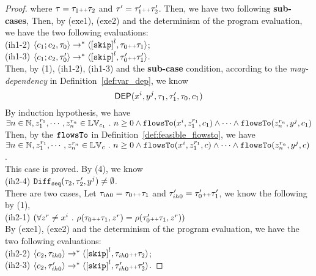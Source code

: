 \begin{proof}
  where $\mathtt{\tau} = \mathtt{\tau}_1 {\scriptscriptstyle ++} \mathtt{\tau}_2$ 
  and $\mathtt{\tau}' = \mathtt{\tau}_1' {\scriptscriptstyle ++} \mathtt{\tau}_2'$.
Then, we have two following \textbf{sub-cases},
Then, by (exe1), (exe2) and the determinism of the program evaluation, we have the two following evaluations:
\\
(ih1-2) $\config{c_1;c_2 , \trace_0} 
\rightarrow^{*} \config{\clabel{\eskip}^l, \trace_0  \tracecat \trace_1}$;
\\
(ih1-3) $\config{c_1;c_2, \trace_0'}
\rightarrow^{*} \config{\clabel{\eskip}^l, \trace_0'  \tracecat \trace_1'}$.
\\
Then, by (1), (ih1-2), (ih1-3) and the \textbf{sub-case} condition, 
according to the \emph{may-dependency} in Definition~\ref{def:var_dep}, we know
\[
  \mathsf{DEP}(x^i, y^j, \mathtt{\tau}_1, \mathtt{\tau}_1', \mathtt{\tau}_0, c_1)
\]
By induction hypothesis, we have 
\\
$\exists n \in \mathbb{N}, z_1^{r_1}, \cdots, z_n^{r_n} \in \mathbb{LV}_{{c_1}} ~.~ n \geq 0 \land
\mathtt{flowsTo}(x^i,  z_1^{r_1}, c_1) 
\land \cdots \land \mathtt{flowsTo}(z_n^{r_n}, y^j, c_1)$
\\
Then, by the $\mathtt{flowsTo}$ in Definition~\ref{def:feasible_flowsto}, we have 
\\
$\exists n \in \mathbb{N}, z_1^{r_1}, \cdots, z_n^{r_n} \in \mathbb{LV}_{{c}} ~.~ n \geq 0 \land
\mathtt{flowsTo}(x^i,  z_1^{r_1}, c) 
\land \cdots \land \mathtt{flowsTo}(z_n^{r_n}, y^j, c)$.
\\
This case is proved.
By (4), we know 
\\
(ih2-4) $\mathtt{Diff}_{\mathtt{seq}}(\mathtt{\tau}_2, \mathtt{\tau}_2', y^j ) \neq \emptyset$.
\\
There are two cases, 
%
Let $\mathtt{\tau}_{ih0} = \mathtt{\tau}_0 {\scriptscriptstyle ++} \mathtt{\tau}_1$ and $\mathtt{\tau}_{ih0}' = \mathtt{\tau}_0' {\scriptscriptstyle ++} \mathtt{\tau}_1'$, we know the following 
by (1),
\\
(ih2-1) 
$ (\forall z^r \neq x^i ~.~   
\rho(\mathtt{\tau}_0 {\scriptscriptstyle ++} \mathtt{\tau}_1, z^r ) =   \rho(\mathtt{\tau}_0' {\scriptscriptstyle ++} \mathtt{\tau}_1,z^r) )$
\\
By (exe1), (exe2) and the determinism of the program evaluation, we have the two following evaluations:
\\
(ih2-2) $\config{c_2 , \trace_{ih0}} 
\rightarrow^{*} \config{\clabel{\eskip}^l, \trace_{ih0}  \tracecat \trace_2}$;
\\
(ih2-3) $\config{c_2, \trace_{ih0}'}
\rightarrow^{*} \config{\clabel{\eskip}^l, \trace_{ih0}'  \tracecat \trace_2'}$.

\end{proof}
